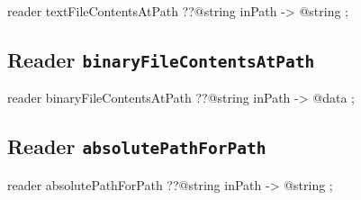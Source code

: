 \begin{galgascode}
reader textFileContentsAtPath ??@string inPath -> @string ;
\end{galgascode}










\subsection{Reader \texttt{binaryFileContentsAtPath}}

\begin{galgascode}
reader binaryFileContentsAtPath ??@string inPath -> @data ;
\end{galgascode}










\subsection{Reader \texttt{absolutePathForPath}}

\begin{galgascode}
reader absolutePathForPath ??@string inPath -> @string ;
\end{galgascode}


